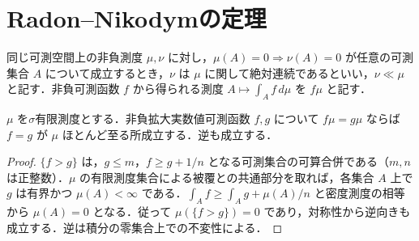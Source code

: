 \section{Radon–Nikodymの定理}
\begin{defn}[測度の絶対連続性]
同じ可測空間上の非負測度 $\mu,\nu$ に対し，$\mu(A)=0\Rightarrow\nu(A)=0$ が任意の可測集合 $A$ について成立するとき，$\nu$ は $\mu$ に関して絶対連続であるといい，$\nu\ll\mu$ と記す．非負可測函数 $f$ から得られる測度 $A\mapsto\int_A f\,d\mu$ を $f\mu$ と記す．
\end{defn}
\begin{prop}[密度の一意性]
$\mu$ を$\sigma$有限測度とする．非負拡大実数値可測函数 $f,g$ について $f\mu=g\mu$ ならば $f=g$ が $\mu$ ほとんど至る所成立する．逆も成立する．
\end{prop}
\begin{proof}
$\{f>g\}$ は，$g\leq m$，$f\geq g+1/n$ となる可測集合の可算合併である（$m,n$ は正整数）．$\mu$ の有限測度集合による被覆との共通部分を取れば，各集合 $A$ 上で $g$ は有界かつ $\mu(A)<\infty$ である．$\int_A f\geq\int_A g+\mu(A)/n$ と密度測度の相等から $\mu(A)=0$ となる．従って $\mu(\{f>g\})=0$ であり，対称性から逆向きも成立する．逆は積分の零集合上での不変性による．
\end{proof}
